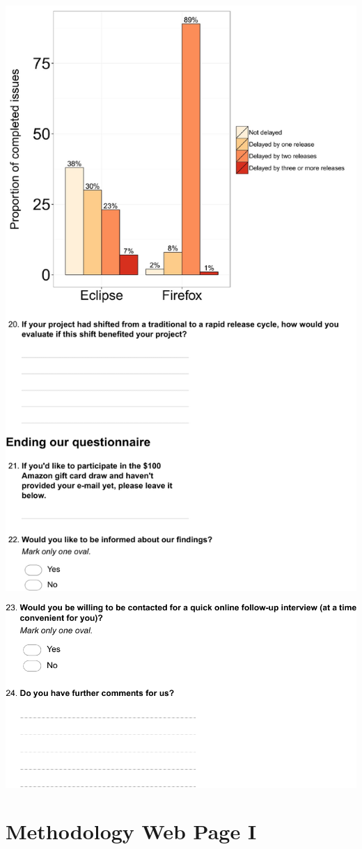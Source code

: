 \documentclass[
	12pt,				%
	openright,			%
	oneside,			%
	a4paper,			%
	french,				%
	spanish,			%
	brazil,				%
	english
	]{abntex2}
\newcounter{pt}
\newcounter{th}
\begin{document}
\begin{apendicesenv}
\includegraphics[width=.8\textwidth,keepaspectratio]{chapters/chapter5/appendix/Eclipse7.pdf}

\includegraphics[width=.8\textwidth,keepaspectratio]{chapters/chapter5/appendix/Eclipse8.pdf}

\chapter{Methodology Web Page I}\label{methodology:i}


\end{apendicesenv}
\end{document}
